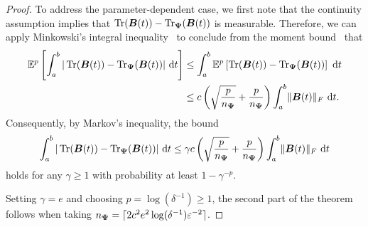 \begin{proof}
    To address the parameter-dependent case, we first note that the continuity assumption implies that $\operatorname{Tr}(\boldsymbol{B}(t)) - \operatorname{Tr}_{\boldsymbol{\Psi}}(\boldsymbol{B}(t))$ is measurable. Therefore, we can apply Minkowski's integral inequality~\cite[Theorem 202]{hardy-1952-inequalities} to conclude from the moment bound~ that
    \begin{align}
        \mathbb{E}^{p}\left[ \int_{a}^{b} |\operatorname{Tr}(\boldsymbol{B}(t)) - \operatorname{Tr}_{\boldsymbol{\Psi}}(\boldsymbol{B}(t))|~\mathrm{d}t  \right]
        &\leq \int_{a}^{b} \mathbb{E}^{p}\left[ \operatorname{Tr}(\boldsymbol{B}(t)) - \operatorname{Tr}_{\boldsymbol{\Psi}}(\boldsymbol{B}(t)) \right]~\mathrm{d}t \notag \\
        &\leq c \left( \sqrt{\frac{p}{n_{\boldsymbol{\Psi}}}} + \frac{p}{n_{\boldsymbol{\Psi}}}  \right) \int_{a}^{b} \lVert \boldsymbol{B}(t) \rVert _F~\mathrm{d}t .
    \end{align}
    Consequently, by Markov's inequality, the bound 
    \begin{equation} 
        \int_{a}^{b} |\operatorname{Tr}(\boldsymbol{B}(t)) - \operatorname{Tr}_{\boldsymbol{\Psi}}(\boldsymbol{B}(t))|~\mathrm{d}t \leq \gamma c \left( \sqrt{\frac{p}{n_{\boldsymbol{\Psi}}}} + \frac{p}{n_{\boldsymbol{\Psi}}}  \right) \int_{a}^{b} \lVert \boldsymbol{B}(t) \rVert _F~\mathrm{d}t
    \end{equation}
    holds for any $\gamma \geq 1$ with probability at least $1 - \gamma^{-p}$. 

    Setting $\gamma = e$ and choosing $p = \log(\delta^{-1}) \geq 1$, the second part of the theorem follows when taking $n_{\boldsymbol{\Psi}} = \lceil 2 c^2 e^2 \log(\delta^{-1}) \varepsilon^{-2} \rceil$.
\end{proof}
